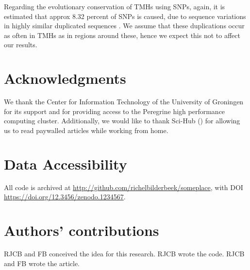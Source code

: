 Regarding the evolutionary conservation of TMHs using SNPs,
again, it is estimated that approx 8.32 percent
of SNPs is caused, due to sequence variations in
highly similar duplicated sequences \cite{musumeci2010single}.
We assume that these duplications occur as often in TMHs as in
regions around these, hence we expect this not to affect our results.


\section{Acknowledgments}

We thank the Center for Information Technology of the University 
of Groningen for its support and for providing access to the Peregrine 
high performance computing cluster. 
Additionally, we would like to thank Sci-Hub (\cite{himmelstein2018sci})
for allowing us to read paywalled articles while working from home.

\section{Data Accessibility}

All code is archived at \url{http://github.com/richelbilderbeek/someplace},
with DOI \url{https://doi.org/12.3456/zenodo.1234567}.

\section{Authors' contributions}

RJCB and FB conceived the idea for this research. 
RJCB wrote the code.
RJCB and FB wrote the article.





